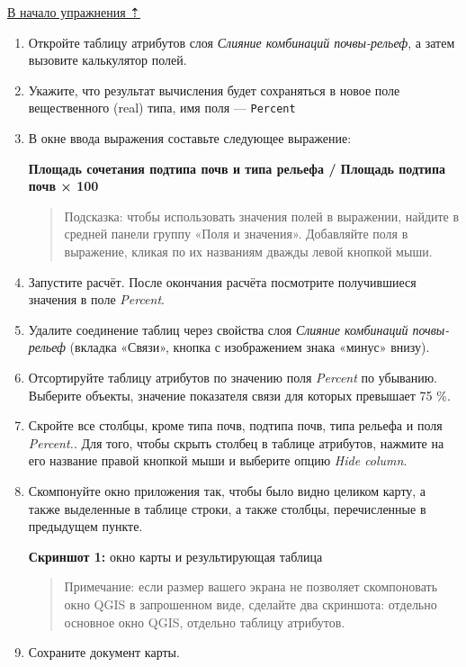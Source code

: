 \documentclass[
  12pt,
]{book}
\begin{document}
\protect\hyperlink{overlay}{В начало упражнения ⇡}

\begin{enumerate}
\def\labelenumi{\arabic{enumi}.}
\item
  Откройте таблицу атрибутов слоя \emph{Слияние комбинаций почвы-рельеф}, а затем вызовите калькулятор полей.
\item
  Укажите, что результат вычисления будет сохраняться в новое поле вещественного (real) типа, имя поля --- \texttt{Percent}
\item
  В окне ввода выражения составьте следующее выражение:

  \textbf{Площадь сочетания подтипа почв и типа рельефа / Площадь подтипа почв × 100 }

  \begin{quote}
  Подсказка: чтобы использовать значения полей в выражении, найдите в средней панели группу «Поля и значения». Добавляйте поля в выражение, кликая по их названиям дважды левой кнопкой мыши.
  \end{quote}
\item
  Запустите расчёт. После окончания расчёта посмотрите получившиеся значения в поле \emph{Percent}.
\item
  Удалите соединение таблиц через свойства слоя \emph{Слияние комбинаций почвы-рельеф} (вкладка «Связи», кнопка с изображением знака «минус» внизу).
\item
  Отсортируйте таблицу атрибутов по значению поля \emph{Percent} по убыванию. Выберите объекты, значение показателя связи для которых превышает 75 \%.
\item
  Скройте все столбцы, кроме типа почв, подтипа почв, типа рельефа и поля \emph{Percent.}. Для того, чтобы скрыть столбец в таблице атрибутов, нажмите на его название правой кнопкой мыши и выберите опцию \emph{Hide column}.
\item
  Скомпонуйте окно приложения так, чтобы было видно целиком карту, а также выделенные в таблице строки, а также столбцы, перечисленные в предыдущем пункте.

  \textbf{Скриншот 1:} окно карты и результирующая таблица

  \begin{quote}
  Примечание: если размер вашего экрана не позволяет скомпоновать окно QGIS в запрошенном виде, сделайте два скриншота: отдельно основное окно QGIS, отдельно таблицу атрибутов.
  \end{quote}
\item
  Сохраните документ карты.
\end{enumerate}
\end{document}
